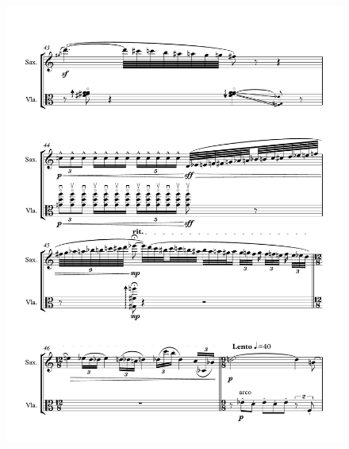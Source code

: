 \begin{figure}[htbp]
    \centering
	\includegraphics[width=6.5in]{figures/Sax_Viola_19.pdf}
\end{figure}

